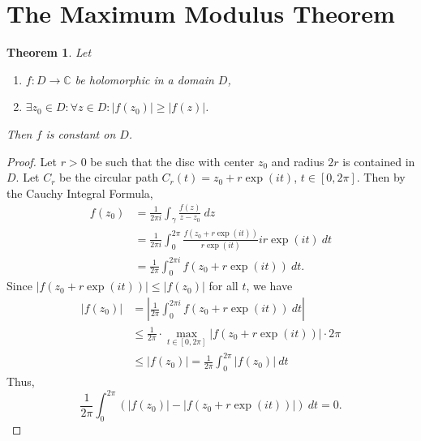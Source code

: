 \documentclass[12pt,openany]{book}
\newtheorem{theorem}{Theorem}[chapter]
\theoremstyle{definition}
\newcommand{\C}{\mathbb{C}}
\newcommand{\of}[1]{\left( #1 \right)}
\newcommand{\abs}[1]{\left\lvert #1 \right\rvert}
\begin{document}
	\section{The Maximum Modulus Theorem}
	
	\begin{tcolorbox}[colback=white,colframe=thmcolor,arc=5pt,title={\color{white}\bf Maximum Modulus Theorem}]
		\begin{theorem}
			Let \begin{enumerate}[(1)]
				\item $f:D\to\C$ be holomorphic in a domain $D$,
				\item $\exists z_0\in D:\forall z\in D:\abs{f(z_0)}\geq\abs{f(z)}$.
			\end{enumerate} Then $f$ is constant on $D$.
		\end{theorem}
	\end{tcolorbox}
	\begin{proof}
		Let $r>0$ be such that the disc with center $z_0$ and radius $2r$ is contained in $D$. Let $C_r$ be the circular path $C_r(t)=z_0+r\exp(it)$, $t\in[0,2\pi]$. Then by the Cauchy Integral Formula, \begin{align*}
			f(z_0)&=\frac{1}{2\pi i}\int_\gamma\frac{f(z)}{z-z_0}\ dz\\
			&=\frac{1}{2\pi i}\int_0^{2\pi}\frac{f(z_0+r\exp(it))}{r\exp(it)}ir\exp(it)\ dt\\
			&=\frac{1}{2\pi}\int_0^{2\pi i}f(z_0+r\exp(it))\ dt.
		\end{align*} Since $\abs{f(z_0+r\exp(it))}\leq\abs{f(z_0)}$ for all $t$, we have \begin{align*}
			\abs{f(z_0)}&=\abs{\frac{1}{2\pi}\int_0^{2\pi i}f(z_0+r\exp(it))\ dt}\\
			&\leq\frac{1}{2\pi}\cdot\max_{t\in[0,2\pi]}\abs{f(z_0+r\exp(it))}\cdot 2\pi\\
			&\leq\abs{f(z_0)}=\frac{1}{2\pi}\int_0^{2\pi}\abs{f(z_0)}\ dt
		\end{align*} Thus, \[
		\frac{1}{2\pi}\int_0^{2\pi}\of{\abs{f(z_0)}-\abs{f(z_0+r\exp(it))}}\ dt =0.
		\]
	\end{proof}
	\vspace{8pt}
\end{document}

